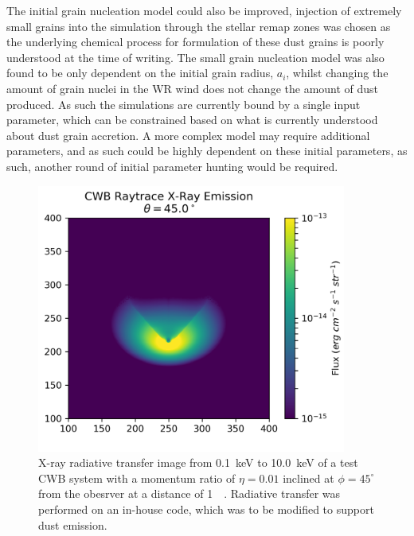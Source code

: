 
The initial grain nucleation model could also be improved, injection of extremely small grains into the simulation through the stellar remap zones was chosen as the underlying chemical process for formulation of these dust grains is poorly understood at the time of writing.
The small grain nucleation model was also found to be only dependent on the initial grain radius, $a_i$, whilst changing the amount of grain nuclei in the WR wind does not change the amount of dust produced.
As such the simulations are currently bound by a single input parameter, which can be constrained based on what is currently understood about dust grain accretion.
A more complex model may require additional parameters, and as such could be highly dependent on these initial parameters, as such, another round of initial parameter hunting would be required.


\begin{figure}[ht]
  \centering
  \includegraphics[width=4in]{assets/ray/cwb-raytrace-045.0.png}
  \caption{X-ray radiative transfer image from \SI{0.1}{\kilo\electronvolt} to \SI{10.0}{\kilo\electronvolt} of a test CWB system with a momentum ratio of $\eta = 0.01$ inclined at $\phi = 45^\circ$ from the obesrver at a distance of \SI{1}{\kilo\parsec}. Radiative transfer was performed on an in-house code, which was to be modified to support dust emission.}
  \label{fig:inhousert}
\end{figure}


